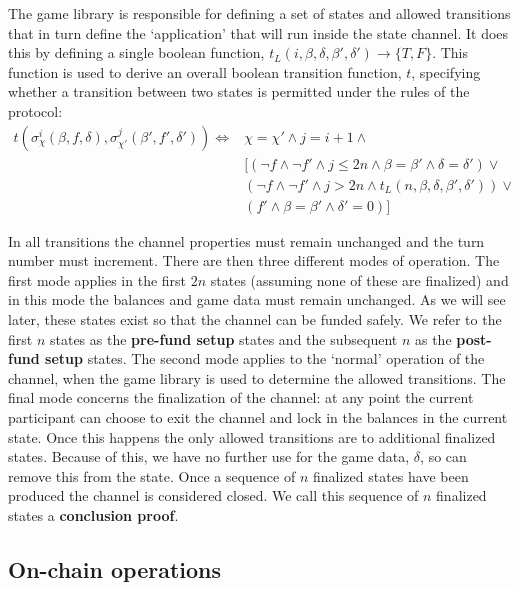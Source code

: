 The game library is responsible for defining a set of states and allowed transitions that
in turn define the `application' that will run inside the state channel. It does this by
defining a single boolean function, $t_L(i, \beta, \delta, \beta', \delta') \rightarrow \{ T, F\}$.
This function is used to derive an overall boolean transition function, $t$, specifying whether
a transition between two states is permitted under the rules of the protocol:
\begin{align*}
  t(\sigma_\chi^i(\beta, f, \delta), \sigma_{\chi'}^j(\beta', f', \delta') ) \Leftrightarrow &
    \chi = \chi'
    \wedge j = i + 1
    \wedge \\
    & [ (\neg f \wedge \neg f' \wedge j \leq 2n \wedge \beta = \beta' \wedge \delta = \delta') \vee \\
    & (\neg f \wedge \neg f' \wedge j > 2n \wedge t_L(n, \beta, \delta, \beta', \delta')) \vee \\
    & (f' \wedge \beta = \beta' \wedge \delta' = 0) ]
\end{align*}

In all transitions the channel properties must remain unchanged and the turn number must increment.
There are then three different modes of operation. The first mode applies in the first $2n$
states (assuming none of these are finalized) and in this mode the balances and game data
must remain unchanged. As we will see later, these states exist so that the channel can be
funded safely. We refer to the first $n$ states as the \textbf{pre-fund setup} states and
the subsequent $n$ as the \textbf{post-fund setup} states. The second mode applies to the
`normal' operation of the channel, when the game library is used to determine the allowed
transitions. The final mode concerns the finalization of the channel: at any point the current
participant can choose to exit the channel and lock in the balances in the current state.
Once this happens the only allowed transitions are to additional finalized states. Because
of this, we have no further use for the game data, $\delta$, so can remove this from the state.
Once a sequence of $n$ finalized states have been produced the channel is considered closed. We
call this sequence of $n$ finalized states a \textbf{conclusion proof}.



\subsection{On-chain operations}

